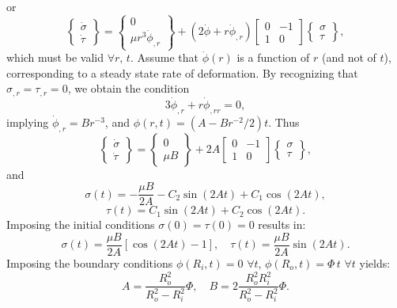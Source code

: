 or
\begin{equation}
  \left\{ \begin{array}{c} \dot{\sigma} \\ \dot{\tau} \end{array} \right\} = \left\{ \begin{array}{c} 0 \\ \mu r^3 \dot{\phi}_{,r} \end{array} \right\} + (2 \dot{\phi} + r \dot{\phi}_{,r}) \left[ \begin{array}{cc} 0 & -1 \\ 1 & 0 \end{array} \right] \left\{ \begin{array}{c} \sigma \\ \tau \end{array} \right\},
\end{equation}
which must be valid $\forall r, \, t$. Assume that $\dot{\phi}(r)$ is a function of $r$ (and not of $t$), corresponding to a steady state rate of deformation. By recognizing that $\sigma_{,r} = \tau_{,r} = 0$, we obtain the condition
\begin{equation}
  3 \dot{\phi}_{,r} + r \dot{\phi}_{,rr} = 0,
\end{equation}
implying $\dot{\phi}_{,r} = B r^{-3}$, and $\phi (r, t) = (A - B r^{-2} / 2)t$. Thus
\begin{equation}
  \left\{ \begin{array}{c} \dot{\sigma} \\ \dot{\tau} \end{array} \right\} = \left\{ \begin{array}{c} 0 \\ \mu B \end{array} \right\} + 2 A \left[ \begin{array}{cc} 0 & -1 \\ 1 & 0 \end{array} \right] \left\{ \begin{array}{c} \sigma \\ \tau \end{array} \right\},
\end{equation}
and
\begin{equation}
  \sigma(t) = - \frac{\mu B}{2 A} - C_2 \sin (2 A t) + C_1 \cos (2 A t),
\end{equation}
\begin{equation}
  \tau(t) = C_1 \sin (2 A t) + C_2 \cos (2 A t).
\end{equation}
Imposing the initial conditions $\sigma(0) = \tau(0) = 0$ results in:
\begin{equation}
  \sigma(t) = \frac{\mu B}{2 A} \left[ \cos (2 A t) - 1 \right], \quad \tau(t) = \frac{\mu B}{2 A} \sin (2 A t).
\end{equation}
Imposing the boundary conditions $\phi(R_i,t) = 0 \, \, \forall t$, $\phi(R_o,t) = \Phi \, t \, \, \forall t$ yields:
\begin{equation}
  A = \frac{R_o^{2}}{R_o^{2} - R_i^{2}} \Phi, \quad B = 2 \frac{R_o^{2} R_i^{2}}{R_o^{2} - R_i^{2}} \Phi.
\end{equation}

